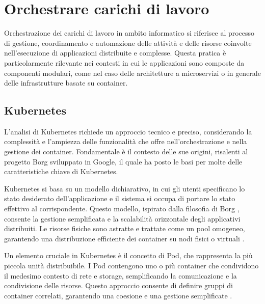 % 
% 
% 



\section{Orchestrare carichi di lavoro}

Orchestrazione dei carichi di lavoro in ambito informatico si riferisce al processo di gestione, coordinamento e automazione delle attività e delle risorse coinvolte nell'esecuzione di applicazioni distribuite e complesse. Questa pratica è particolarmente rilevante nei contesti in cui le applicazioni sono composte da componenti modulari, come nel caso delle architetture a microservizi o in generale delle infrastrutture basate su container.

\subsection{Kubernetes}

L'analisi di Kubernetes richiede un approccio tecnico e preciso, considerando la complessità e l'ampiezza delle funzionalità che offre nell'orchestrazione e nella gestione dei container. Fondamentale è il contesto delle sue origini, risalenti al progetto Borg sviluppato in Google, il quale ha posto le basi per molte delle caratteristiche chiave di Kubernetes.

Kubernetes si basa su un modello dichiarativo, in cui gli utenti specificano lo stato desiderato dell'applicazione e il sistema si occupa di portare lo stato effettivo al corrispondente. Questo modello, ispirato dalla filosofia di Borg \cite{verma2015large}, consente la gestione semplificata e la scalabilità orizzontale degli applicativi distribuiti. Le risorse fisiche sono astratte e trattate come un pool omogeneo, garantendo una distribuzione efficiente dei container su nodi fisici o virtuali \cite{burns2016borg}.

Un elemento cruciale in Kubernetes è il concetto di Pod, che rappresenta la più piccola unità distribuibile. I Pod contengono uno o più container che condividono il medesimo contesto di rete e storage, semplificando la comunicazione e la condivisione delle risorse. Questo approccio consente di definire gruppi di container correlati, garantendo una coesione e una gestione semplificate \cite{burns2016borg}.

